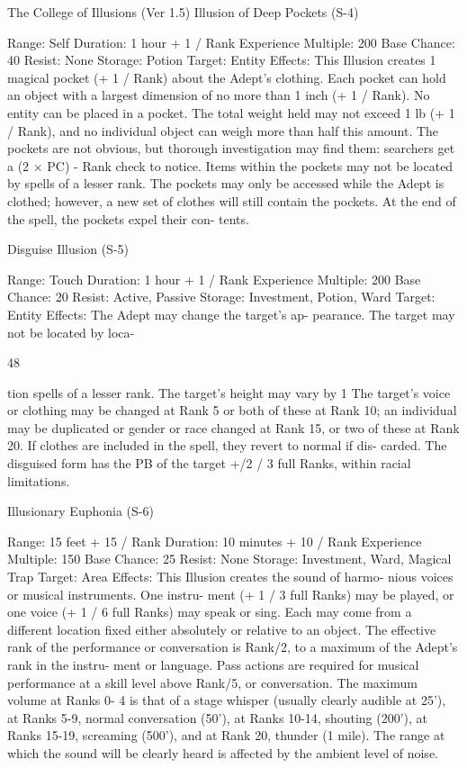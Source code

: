 \begin{Chapter}{The College of Illusions (Ver 1.5)}
Illusion of Deep Pockets (S-4) 

Range: Self 
Duration: 1 hour + 1 / Rank 
Experience Multiple: 200 
Base Chance: 40%
Resist: None 
Storage: Potion 
Target: Entity 
Effects: This Illusion creates 1 magical pocket (+ 1 
/  Rank)  about  the  Adept’s  clothing.  Each  pocket 
can  hold  an  object  with  a  largest  dimension  of  no 
more  than  1  inch  (+  1  /  Rank).  No  entity  can  be 
placed  in  a  pocket.  The  total  weight  held  may  not 
exceed 1 lb (+ 1 / Rank), and no individual object 
can weigh more than half this amount. The pockets 
are  not  obvious,  but  thorough  investigation  may 
find them: searchers get a (2 × PC) - Rank check to 
notice. Items within the pockets may not be located 
by spells of a lesser rank. The pockets may only be 
accessed  while  the  Adept  is  clothed;  however,  a 
new set of clothes will still contain the pockets. At 
the  end  of  the  spell,  the  pockets  expel  their  con-
tents. 

Disguise Illusion (S-5) 

Range: Touch 
Duration: 1 hour + 1 / Rank 
Experience Multiple: 200 
Base Chance: 20%
Resist: Active, Passive 
Storage: Investment, Potion, Ward 
Target: Entity 
Effects:  The  Adept  may  change  the  target’s  ap-
pearance.  The  target  may  not  be  located  by  loca-

48 

tion spells of a lesser rank. The target’s height may 
vary by 1%
The  target’s  voice  or  clothing  may  be  changed  at 
Rank 5  or  both  of  these  at Rank 10; an individual 
may  be  duplicated  or  gender  or  race  changed  at 
Rank 15, or two of these at Rank 20. If clothes are 
included  in  the  spell,  they  revert  to  normal  if  dis-
carded. The disguised form has the PB of the target 
+/2 / 3 full Ranks, within racial limitations. 

Illusionary Euphonia (S-6) 

Range: 15 feet + 15 / Rank 
Duration: 10 minutes + 10 / Rank 
Experience Multiple: 150 
Base Chance: 25%
Resist: None 
Storage: Investment, Ward, Magical Trap 
Target: Area 
Effects:  This  Illusion  creates  the  sound  of  harmo-
nious  voices  or  musical  instruments.  One  instru-
ment  (+  1  /  3  full  Ranks)  may  be  played,  or  one 
voice (+ 1 / 6 full Ranks) may speak or sing. Each 
may  come  from  a  different  location  fixed  either 
absolutely  or  relative  to  an  object.  The  effective 
rank of the performance or conversation is Rank/2, 
to  a  maximum  of  the  Adept’s  rank  in  the  instru-
ment  or  language.  Pass  actions  are  required  for 
musical performance at a skill level above Rank/5, 
or conversation. The maximum volume at Ranks 0-
4 is that of a stage whisper (usually clearly audible 
at 25’), at Ranks 5-9, normal conversation (50’), at 
Ranks  10-14,  shouting  (200’),  at  Ranks  15-19, 
screaming (500’), and at Rank 20, thunder (1 mile). 
The range at which the sound will be clearly heard 
is affected by the ambient level of noise. 


\end{Chapter}
